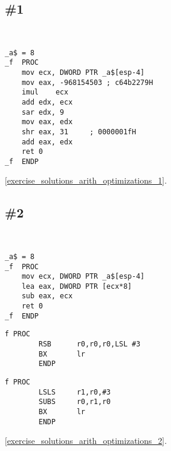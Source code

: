 \section{\Exercises}

\subsection{\Exercise \#1}
\label{exercise_arith_optimizations_1}

\WhatThisCodeDoes\

\begin{lstlisting}[caption=\Optimizing MSVC 2010]
_a$ = 8
_f	PROC
	mov	ecx, DWORD PTR _a$[esp-4]
	mov	eax, -968154503	; c64b2279H
	imul	ecx
	add	edx, ecx
	sar	edx, 9
	mov	eax, edx
	shr	eax, 31		; 0000001fH
	add	eax, edx
	ret	0
_f	ENDP
\end{lstlisting}

\Answer\: \ref{exercise_solutions_arith_optimizations_1}.

\subsection{\Exercise \#2}
\label{exercise_arith_optimizations_2}

\WhatThisCodeDoes\

\begin{lstlisting}[caption=\Optimizing MSVC 2010]
_a$ = 8
_f	PROC
	mov	ecx, DWORD PTR _a$[esp-4]
	lea	eax, DWORD PTR [ecx*8]
	sub	eax, ecx
	ret	0
_f	ENDP
\end{lstlisting}

\begin{lstlisting}[caption=\NonOptimizingKeilVI (\ARMMode)]
f PROC
        RSB      r0,r0,r0,LSL #3
        BX       lr
        ENDP
\end{lstlisting}

\begin{lstlisting}[caption=\NonOptimizingKeilVI (\ThumbMode)]
f PROC
        LSLS     r1,r0,#3
        SUBS     r0,r1,r0
        BX       lr
        ENDP
\end{lstlisting}

\Answer\: \ref{exercise_solutions_arith_optimizations_2}.
